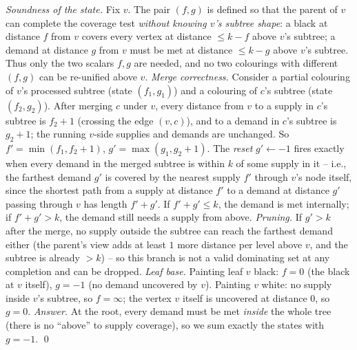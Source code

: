 \begin{proofbox}
\emph{Soundness of the state.} Fix $v$. The pair $(f,g)$ is defined so that the
parent of $v$ can complete the coverage test \emph{without knowing $v$'s subtree
shape}: a black at distance $f$ from $v$ covers every vertex at distance $\le k - f$
above $v$'s subtree; a demand at distance $g$ from $v$ must be met at distance
$\le k - g$ above $v$'s subtree. Thus only the two scalars $f, g$ are needed, and
no two colourings with different $(f,g)$ can be re-unified above $v$. \emph{Merge
correctness.} Consider a partial colouring of $v$'s processed subtree (state $(f_1, g_1)$)
and a colouring of $c$'s subtree (state $(f_2, g_2)$). After merging $c$ under $v$,
every distance from $v$ to a supply in $c$'s subtree is $f_2 + 1$ (crossing the edge
$(v,c)$), and to a demand in $c$'s subtree is $g_2 + 1$; the running $v$-side
supplies and demands are unchanged. So $f' = \min(f_1, f_2 + 1)$, $g' = \max(g_1, g_2 + 1)$.
The \emph{reset} $g' \gets -1$ fires exactly when every demand in the merged subtree is
within $k$ of some supply in it -- i.e., the farthest demand $g'$ is covered by the
nearest supply $f'$ through $v$'s node itself, since the shortest path from a supply
at distance $f'$ to a demand at distance $g'$ passing through $v$ has length $f' + g'$.
If $f' + g' \le k$, the demand is met internally; if $f' + g' > k$, the demand still
needs a supply from above. \emph{Pruning.} If $g' > k$ after the merge, no supply
outside the subtree can reach the farthest demand either (the parent's view adds at
least $1$ more distance per level above $v$, and the subtree is already $> k$) --
so this branch is not a valid dominating set at any completion and can be dropped.
\emph{Leaf base.} Painting leaf $v$ black: $f = 0$ (the black at $v$ itself), $g = -1$
(no demand uncovered by $v$). Painting $v$ white: no supply inside $v$'s subtree, so
$f = \infty$; the vertex $v$ itself is uncovered at distance $0$, so $g = 0$. \emph{Answer.}
At the root, every demand must be met \emph{inside} the whole tree (there is no ``above''
to supply coverage), so we sum exactly the states with $g = -1$. \qed
\end{proofbox}

